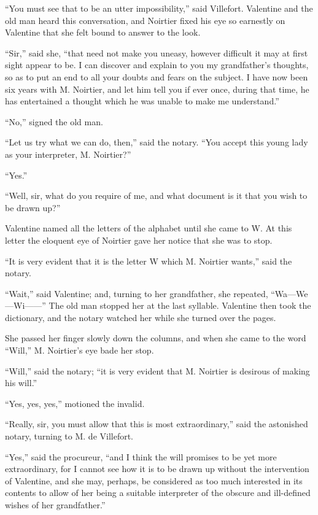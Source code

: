 “You must see that to be an utter impossibility,” said Villefort.
Valentine and the old man heard this conversation, and Noirtier fixed
his eye so earnestly on Valentine that she felt bound to answer to the
look.

“Sir,” said she, “that need not make you uneasy, however difficult it
may at first sight appear to be. I can discover and explain to you my
grandfather’s thoughts, so as to put an end to all your doubts and
fears on the subject. I have now been six years with M. Noirtier, and
let him tell you if ever once, during that time, he has entertained a
thought which he was unable to make me understand.”

“No,” signed the old man.

“Let us try what we can do, then,” said the notary. “You accept this
young lady as your interpreter, M. Noirtier?”

“Yes.”

“Well, sir, what do you require of me, and what document is it that you
wish to be drawn up?”

Valentine named all the letters of the alphabet until she came to W. At
this letter the eloquent eye of Noirtier gave her notice that she was
to stop.

“It is very evident that it is the letter W which M. Noirtier wants,”
said the notary.

“Wait,” said Valentine; and, turning to her grandfather, she repeated,
“Wa—We—Wi——” The old man stopped her at the last syllable. Valentine
then took the dictionary, and the notary watched her while she turned
over the pages.

She passed her finger slowly down the columns, and when she came to the
word “Will,” M. Noirtier’s eye bade her stop.

“Will,” said the notary; “it is very evident that M. Noirtier is
desirous of making his will.”

“Yes, yes, yes,” motioned the invalid.

“Really, sir, you must allow that this is most extraordinary,” said the
astonished notary, turning to M. de Villefort.

“Yes,” said the procureur, “and I think the will promises to be yet
more extraordinary, for I cannot see how it is to be drawn up without
the intervention of Valentine, and she may, perhaps, be considered as
too much interested in its contents to allow of her being a suitable
interpreter of the obscure and ill-defined wishes of her grandfather.”

